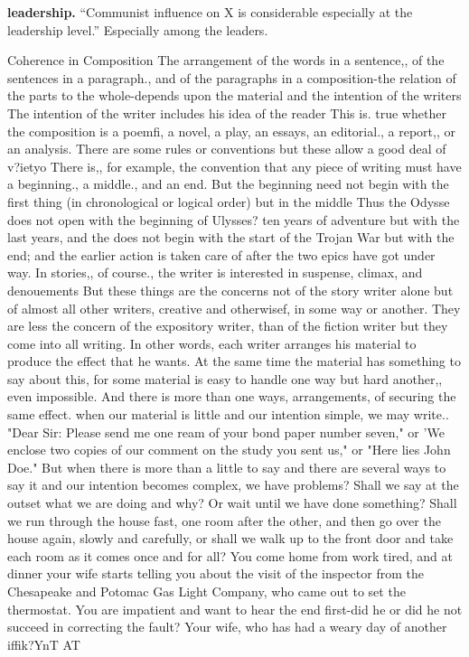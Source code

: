 \documentclass[
    oneside,
    11pt,
    draft
]{memoir}
\begin{document}
\textbf{leadership.} \enquote{Communist influence on X is considerable  especially at the leadership level.} Especially among the leaders.

Coherence in Composition The arrangement of the words in a sentence,, of the sentences in a paragraph., and of the paragraphs in a composition-the relation of the parts to the whole-depends upon the material and the intention of the writers The intention of the writer includes his idea of the reader This is. true whether the composition is a poemfi, a novel, a play, an essays, an editorial., a report,, or an analysis. There are some rules or conventions but these allow a good deal of v?ietyo There is,, for example, the convention that any piece of writing must have a beginning., a middle., and an end. But the beginning need not begin with the first thing (in chronological or logical order) but in the middle Thus the Odysse does not open with the beginning of Ulysses? ten years of adventure but with the last years, and the does not begin with the start of the Trojan War but with the end; and the earlier action is taken care of after the two epics have got under way. In stories,, of course., the writer is interested in suspense, climax, and denouements But these things are the concerns not of the story writer alone but of almost all other writers, creative and otherwisef, in some way or another. They are less the concern of the expository writer, than of the fiction writer but they come into all writing. In other words, each writer arranges his material to produce the effect that he wants. At the same time the material has something to say about this, for some material is easy to handle one way but hard another,, even impossible. And there is more than one ways, arrangements, of securing the same effect. when our material is little and our intention simple, we may write.. "Dear Sir: Please send me one ream of your bond paper number seven," or 'We enclose two copies of our comment on the study you sent us," or "Here lies John Doe." But when there is more than a little to say and there are several ways to say it and our intention becomes complex, we have problems? Shall we say at the outset what we are doing and why? Or wait until we have done something? Shall we run through the house fast, one room after the other, and then go over the house again, slowly and carefully, or shall we walk up to the front door and take each room as it comes once and for all? You come home from work tired, and at dinner your wife starts telling you about the visit of the inspector from the Chesapeake and Potomac Gas Light Company, who came out to set the thermostat. You are impatient and want to hear the end first-did he or did he not succeed in correcting the fault? Your wife, who has had a weary day of another iffik?YnT AT
\end{document}
